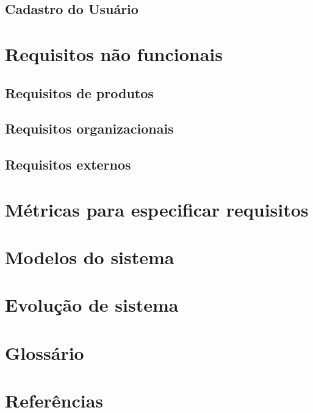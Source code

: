 \documentclass[letter]{article}
\begin{document}
\subsection{Cadastro do Usuário}
\section{Requisitos não funcionais}
\subsection{Requisitos de produtos}
\subsection{Requisitos organizacionais}
\subsection{Requisitos externos}
\section{Métricas para especificar requisitos}
\section{Modelos do sistema}
\section{Evolução de sistema}
\section{Glossário}
\section{Referências}
\end{document}
